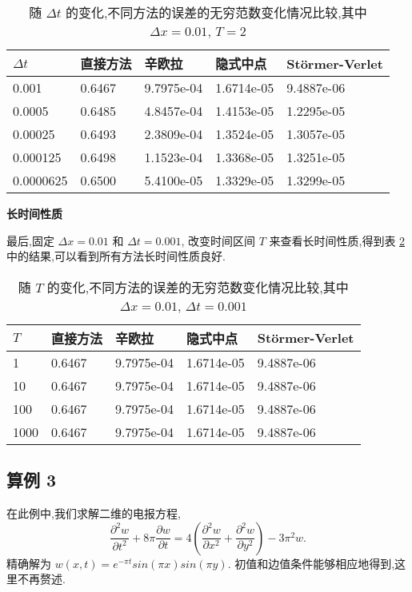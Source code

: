 \begin{table}[h]
  \centering
\caption{随 $\Delta t$ 的变化,不同方法的误差的无穷范数变化情况比较,其中 $\Delta x=0.01$, $T=2$}
\begin{tabularx}{\linewidth}{XXXXX}
 \toprule[1.5pt]
 $\Delta t$ &直接方法 & 辛欧拉 & 隐式中点 & St\"{o}rmer-Verlet\\
 \midrule[1pt]
 0.001 & 0.6467 & 9.7975e-04 & 1.6714e-05 & 9.4887e-06 \\
 0.0005 & 0.6485 & 4.8457e-04 & 1.4153e-05 & 1.2295e-05 \\
 0.00025 & 0.6493 & 2.3809e-04 & 1.3524e-05 & 1.3057e-05 \\
 0.000125 & 0.6498 & 1.1523e-04 & 1.3368e-05 & 1.3251e-05 \\
 0.0000625 & 0.6500 & 5.4100e-05 & 1.3329e-05 & 1.3299e-05 \\
 \bottomrule[1.5pt]
\end{tabularx}
  \label{tab:dt2}
\end{table}

\textbf{长时间性质}

最后,固定 $\Delta x = 0.01$ 和 $\Delta t = 0.001$, 改变时间区间 $T$ 来查看长时间性质,得到表 \ref{tab:t2} 中的结果,可以看到所有方法长时间性质良好.

\begin{table}[h]
  \centering
\caption{随 $T$ 的变化,不同方法的误差的无穷范数变化情况比较,其中 $\Delta x=0.01$, $\Delta t=0.001$}
\begin{tabularx}{\linewidth}{XXXXX}
 \toprule[1.5pt]
 $T$ &直接方法 & 辛欧拉 & 隐式中点 & St\"{o}rmer-Verlet\\
 \midrule[1pt]
 1 & 0.6467 & 9.7975e-04 & 1.6714e-05 & 9.4887e-06 \\
 10 & 0.6467 & 9.7975e-04 & 1.6714e-05 & 9.4887e-06 \\
 100 & 0.6467 & 9.7975e-04 & 1.6714e-05 & 9.4887e-06 \\
 1000 & 0.6467 & 9.7975e-04 & 1.6714e-05 & 9.4887e-06 \\
 \bottomrule[1.5pt]
\end{tabularx}
  \label{tab:t2}
\end{table}

\subsection*{算例 3}
在此例中,我们求解二维的电报方程,
\begin{equation*}
\frac{\partial ^2 w}{\partial t^2}+8\pi \frac{\partial w}{\partial
t}=4 (\frac{\partial ^2 w}{\partial x^2} + \frac{\partial ^2
w}{\partial y^2}) -3\pi^2 w.
\end{equation*}
精确解为 $w(x,t) = e^{-\pi t}sin(\pi x)sin(\pi y)$. 初值和边值条件能够相应地得到,这里不再赘述.

